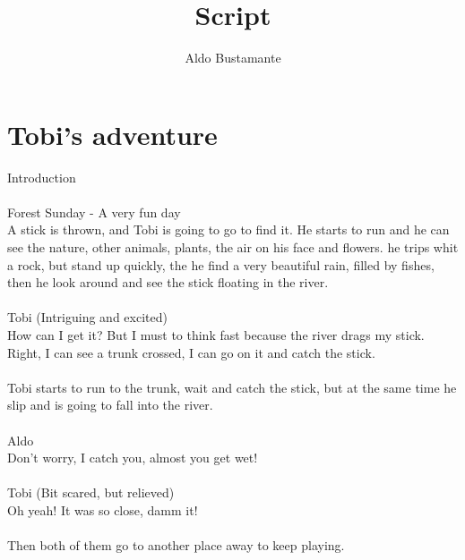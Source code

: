 \documentclass[11pt,a4paper]{article}
\author{Aldo Bustamante}
\title{Script}
\begin{document}
\maketitle
\section{Tobi's adventure}

Introduction\\\\
Forest Sunday - A very fun day\\
A stick is thrown, and Tobi is going to go to find it. He starts to
run and he can see the nature, other animals, plants, the air on his face and
flowers. he trips whit a rock, but stand up quickly, the he find a very beautiful rain, filled by fishes, then he look around and see the stick
floating in the river.\\\\

Tobi (Intriguing and excited)\\
How can I get it? But I must to think fast because the river drags my stick. Right, I can see a trunk crossed, I can go on it and catch the stick.\\\\

Tobi starts to run to the trunk, wait and catch the stick, but at the same time
he slip and is going to fall into the river.\\\\

Aldo\\
Don't worry, I catch you, almost you get wet!\\\\

Tobi (Bit scared, but relieved)\\
Oh yeah! It was so close, damm it!\\\\

Then both of them go to another place away to keep playing.
\end{document}

